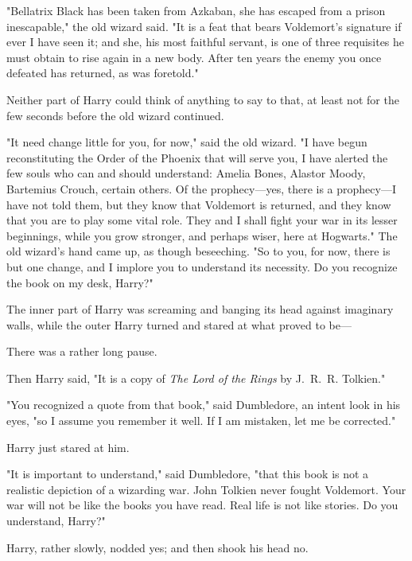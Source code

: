 "Bellatrix Black has been taken from Azkaban, she has escaped from a prison
inescapable," the old wizard said. "It is a feat that bears Voldemort's
signature if ever I have seen it; and she, his most faithful servant, is one of
three requisites he must obtain to rise again in a new body. After ten years
the enemy you once defeated has returned, as was foretold."

Neither part of Harry could think of anything to say to that, at least not for
the few seconds before the old wizard continued.

"It need change little for you, for now," said the old wizard. "I have begun
reconstituting the Order of the Phoenix that will serve you, I have alerted the
few souls who can and should understand: Amelia Bones, Alastor Moody, Bartemius
Crouch, certain others. Of the prophecy---yes, there is a prophecy---I have not
told them, but they know that Voldemort is returned, and they know that you are
to play some vital role. They and I shall fight your war in its lesser
beginnings, while you grow stronger, and perhaps wiser, here at Hogwarts." The
old wizard's hand came up, as though beseeching. "So to you, for now, there is
but one change, and I implore you to understand its necessity. Do you recognize
the book on my desk, Harry?"

The inner part of Harry was screaming and banging its head against imaginary
walls, while the outer Harry turned and stared at what proved to be\mbox{---}

There was a rather long pause.

Then Harry said, "It is a copy of \emph{The Lord of the Rings} by J.~R.~R.
Tolkien."

"You recognized a quote from that book," said Dumbledore, an intent look in his
eyes, "so I assume you remember it well. If I am mistaken, let me be corrected."

Harry just stared at him.

"It is important to understand," said Dumbledore, "that this book is not a
realistic depiction of a wizarding war. John Tolkien never fought Voldemort.
Your war will not be like the books you have read. Real life is not like
stories. Do you understand, Harry?"

Harry, rather slowly, nodded yes; and then shook his head no.


